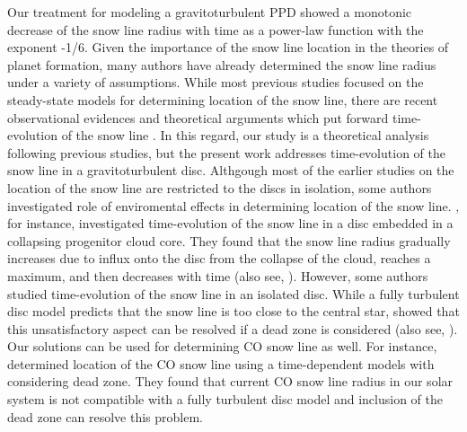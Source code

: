 \documentclass[apj]{emulateapj}
\begin{document}
Our treatment for modeling a gravitoturbulent PPD showed a monotonic decrease of the snow line radius with time as a power-law function with the exponent -1/6.   
%
 Given the importance of the snow line location in the theories of planet formation, many authors have already determined the snow line radius under a variety of assumptions. While most previous studies focused on the steady-state models for determining location of the snow line, there are recent observational evidences  and theoretical arguments which put forward time-evolution of the snow line \citep[e.g.,][]{Zhang13,Piso15}. In this regard, our study is a theoretical analysis  following previous studies, but the present work addresses time-evolution of the snow line in a gravitoturbulent disc. Althgough most of the earlier studies on the location of the snow line are restricted to the discs in isolation, some authors investigated role of enviromental effects in determining location of the snow line.  \cite{Jin2015}, for instance, investigated time-evolution of the snow line in a disc embedded in a collapsing progenitor cloud core. They found that the snow line radius gradually increases due to influx onto the disc from the collapse of the cloud, reaches  a maximum, and then decreases with time (also see, \cite{Jin2010}). However, some authors studied time-evolution of the snow line in an isolated disc. While a fully turbulent disc model predicts that the snow line is too close to the central star, \cite{Martin13} showed that this unsatisfactory aspect can be resolved if a dead zone is considered (also see, \cite{Martin12}). Our solutions can be used for determining CO snow line as well. For instance, \cite{Martin14} determined location of the CO snow line using a time-dependent models with considering dead zone. They found that current CO snow line radius in our solar system is not compatible with a fully turbulent disc model and inclusion of the dead zone can resolve this problem.     
 
\end{document}
